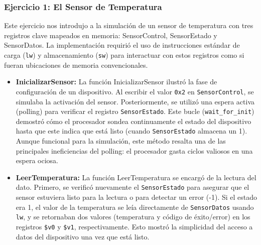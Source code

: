 \documentclass[12pt, a4paper]{article}
\begin{document}
\subsubsection*{Ejercicio 1: El Sensor de Temperatura}
Este ejercicio nos introdujo a la simulación de un sensor de temperatura con tres registros clave mapeados en memoria: SensorControl, SensorEstado y SensorDatos. La implementación requirió el uso de instrucciones estándar de carga (\texttt{lw}) y almacenamiento (\texttt{sw}) para interactuar con estos registros como si fueran ubicaciones de memoria convencionales.
\begin{itemize}
    \item \textbf{InicializarSensor:} La función InicializarSensor ilustró la fase de configuración de un dispositivo. Al escribir el valor \texttt{0x2} en \texttt{SensorControl}, se simulaba la activación del sensor. Posteriormente, se utilizó una espera activa (polling) para verificar el registro \texttt{SensorEstado}. Este bucle (\texttt{wait\_for\_init}) demostró cómo el procesador sondea continuamente el estado del dispositivo hasta que este indica que está listo (cuando \texttt{SensorEstado} almacena un 1). Aunque funcional para la simulación, este método resalta una de las principales ineficiencias del polling: el procesador gasta ciclos valiosos en una espera ociosa.
    \item \textbf{LeerTemperatura:} La función LeerTemperatura se encargó de la lectura del dato. Primero, se verificó nuevamente el \texttt{SensorEstado} para asegurar que el sensor estuviera listo para la lectura o para detectar un error (-1). Si el estado era 1, el valor de la temperatura se leía directamente de \texttt{SensorDatos} usando \texttt{lw}, y se retornaban dos valores (temperatura y código de éxito/error) en los registros \texttt{\$v0} y \texttt{\$v1}, respectivamente. Esto mostró la simplicidad del acceso a datos del dispositivo una vez que está listo.
\end{itemize}
\end{document}
